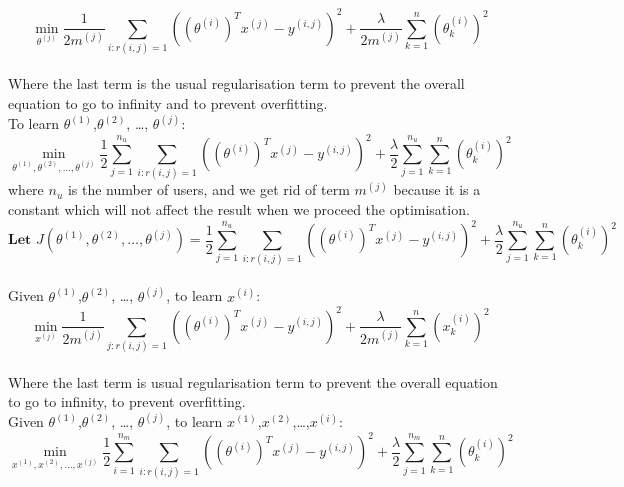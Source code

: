 \begin{equation*}
\min_{\theta^{(j)}} \frac{1}{2m^{(j)}}\sum_{i:r(i,j) = 1}\left((\theta^{(i)})^{T}x^{(j)}-y^{(i,j)}\right)^{2} + \frac{\lambda}{2m^{(j)}}\sum_{k = 1}^{n}(\theta^{(i)}_{k})^{2}
\end{equation*}
\\Where the last term is the usual regularisation term to prevent the overall equation to go to infinity and to prevent overfitting.
\\ To learn $\theta^{(1)}$,$\theta^{(2)}$, \dots, $\theta^{(j)}$:
\begin{equation*}
\min_{\theta^{(1)},\theta^{(2)}, \dots, \theta^{(j)}} \frac{1}{2}\sum_{j = 1}^{n_{u}}\sum_{i:r(i,j) = 1}\left((\theta^{(i)})^{T}x^{(j)}-y^{(i,j)}\right)^{2} + \frac{\lambda}{2}\sum_{j = 1}^{n_{u}}\sum_{k = 1}^{n}(\theta^{(i)}_{k})^{2}
\end{equation*}
where $n_{u}$ is the number of users, and we get rid of term $m^{(j)}$ because it is a constant which will not affect the result when we proceed the optimisation.
\begin{equation*}
\textbf{Let     } J(\theta^{(1)},\theta^{(2)}, \dots, \theta^{(j)}) = \frac{1}{2}\sum_{j = 1}^{n_{u}}\sum_{i:r(i,j) = 1}\left((\theta^{(i)})^{T}x^{(j)}-y^{(i,j)}\right)^{2} + \frac{\lambda}{2}\sum_{j = 1}^{n_{u}}\sum_{k = 1}^{n}(\theta^{(i)}_{k})^{2}
\end{equation*}
\\Given $\theta^{(1)}$,$\theta^{(2)}$, \dots, $\theta^{(j)}$, to learn $x^{(i)}$:
\begin{equation*}
\min_{x^{(j)}} \frac{1}{2m^{(j)}}\sum_{j:r(i,j) = 1}\left((\theta^{(i)})^{T}x^{(j)}-y^{(i,j)}\right)^{2} + \frac{\lambda}{2m^{(j)}}\sum_{k = 1}^{n}(x^{(i)}_{k})^{2}
\end{equation*}
\\Where the last term is usual regularisation term to prevent the overall equation to go to infinity, to prevent overfitting.
\\Given $\theta^{(1)}$,$\theta^{(2)}$, \dots, $\theta^{(j)}$, to learn $x^{(1)}$,$x^{(2)}$,\dots,$x^{(i)}$:
\begin{equation*}
\min_{x^{(1)},x^{(2)}, \dots,x^{(j)}} \frac{1}{2}\sum_{i = 1}^{n_{m}}\sum_{i:r(i,j) = 1}\left((\theta^{(i)})^{T}x^{(j)}-y^{(i,j)}\right)^{2} + \frac{\lambda}{2}\sum_{j = 1}^{n_{m}}\sum_{k = 1}^{n}(\theta^{(i)}_{k})^{2}
\end{equation*}
